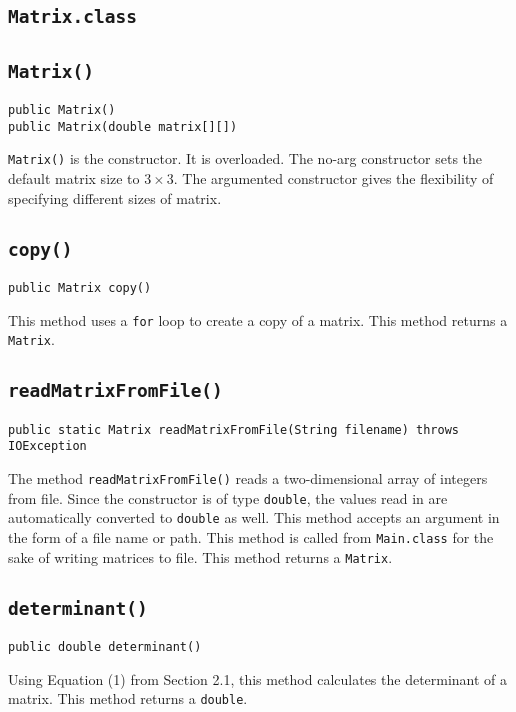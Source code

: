 \documentclass[12pt]{article}
\begin{document}
\newpage %



\begin{center}
\section{\texttt{Matrix.class}}
\end{center}

\subsection{\texttt{Matrix()}}
\begin{verbatim}
public Matrix()
public Matrix(double matrix[][])
\end{verbatim}
\texttt{Matrix()} is the constructor. It is overloaded. The no-arg constructor sets the default matrix size to $3\times3$. The argumented constructor gives the flexibility of specifying different sizes of matrix.

\subsection{\texttt{copy()}}
\begin{verbatim}
public Matrix copy()
\end{verbatim}
This method uses a \texttt{for} loop to create a copy of a matrix. This method returns a \texttt{Matrix}.

\subsection{\texttt{readMatrixFromFile()}}
\begin{verbatim}
public static Matrix readMatrixFromFile(String filename) throws IOException
\end{verbatim}
The method \texttt{readMatrixFromFile()} reads a two-dimensional array of integers from file. Since the constructor is of type \texttt{double}, the values read in are automatically converted to \texttt{double} as well. This method accepts an argument in the form of a file name or path. This method is called from \texttt{Main.class} for the sake of writing matrices to file. This method returns a \texttt{Matrix}.

\subsection{\texttt{determinant()}}
\begin{verbatim}
public double determinant()
\end{verbatim}
Using Equation (1) from Section 2.1, this method calculates the determinant of a matrix. This method returns a \texttt{double}.
\end{document}
